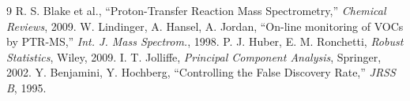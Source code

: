 ﻿\documentclass[11pt,a4paper]{article}
\begin{document}
\begin{thebibliography}{9}
 R. S. Blake et al., ``Proton-Transfer Reaction Mass Spectrometry,'' \emph{Chemical Reviews}, 2009.
 W. Lindinger, A. Hansel, A. Jordan, ``On-line monitoring of VOCs by PTR-MS,'' \emph{Int. J. Mass Spectrom.}, 1998.
 P. J. Huber, E. M. Ronchetti, \emph{Robust Statistics}, Wiley, 2009.
 I. T. Jolliffe, \emph{Principal Component Analysis}, Springer, 2002.
 Y. Benjamini, Y. Hochberg, ``Controlling the False Discovery Rate,'' \emph{JRSS B}, 1995.
\end{thebibliography}
\end{document}
